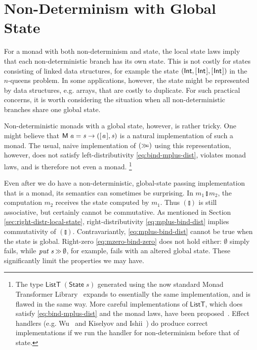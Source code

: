 \documentclass{llncs}
\newcommand{\Conid}[1]{\mathit{#1}}
\newcommand{\Varid}[1]{\mathit{#1}}
\let\Varid\mathit
\let\Conid\mathsf
\begin{document}
\section{Non-Determinism with Global State}
\label{sec:nd-state-global}

For a monad with both non-determinism and state, the local state laws imply that each non-deterministic branch has its own state. This is not costly for states consisting of linked data structures, for example the state \ensuremath{(\Conid{Int},[\mskip1.5mu \Conid{Int}\mskip1.5mu],[\mskip1.5mu \Conid{Int}\mskip1.5mu])} in the \ensuremath{\Varid{n}}-queens problem. In some applications, however, the state might be represented by data structures, e.g. arrays, that are costly to duplicate. For such practical concerns, it is worth considering the situation when all non-deterministic branches share one global state.

Non-deterministic monads with a global state, however, is rather tricky.
One might believe that \ensuremath{\Conid{M}\;\Varid{a}\mathrel{=}\Varid{s}\to ([\mskip1.5mu \Varid{a}\mskip1.5mu],\Varid{s})} is a natural implementation of such a monad.
The usual, naive implementation of \ensuremath{(\mathrel{\hstretch{0.7}{>\!\!>\!\!=}})} using this representation, however, does not satisfy left-distributivity \eqref{eq:bind-mplus-dist}, violates monad laws, and is therefore not even a monad.
\footnote{
The type \ensuremath{\Conid{ListT}\;(\Conid{State}\;\Varid{s})} generated using the now standard Monad Transformer Library~\cite{MTL:14} expands to essentially the same implementation, and is flawed in the same way.
More careful implementations of \ensuremath{\Conid{ListT}}, which does satisfy \eqref{eq:bind-mplus-dist} and the monad laws, have been proposed~\cite{Gale:07:ListT,Volkov:14:list-t}.
Effect handlers (e.g. Wu~\cite{Wu:14:Effect} and Kiselyov and Ishii~\cite{KiselyovIshii:15:Freer}) do produce correct implementations if we run the handler for non-determinism before that of state.
}

Even after we do have a non-deterministic, global-state passing implementation that is a monad, its semantics can sometimes be surprising.
In \ensuremath{\Varid{m}_{1}\mathbin{\talloblong}\Varid{m}_{2}}, the computation \ensuremath{\Varid{m}_{2}} receives the state computed by \ensuremath{\Varid{m}_{1}}.
Thus \ensuremath{(\talloblong)} is still associative, but certainly cannot be commutative.
As mentioned in Section \ref{sec:right-distr-local-state}, right-distributivity \eqref{eq:mplus-bind-dist} implies commutativity of \ensuremath{(\talloblong)}.
Contravariantly, \eqref{eq:mplus-bind-dist} cannot be true when the state is global.
Right-zero \eqref{eq:mzero-bind-zero} does not hold either: \ensuremath{\emptyset} simply fails, while \ensuremath{\Varid{put}\;\Varid{s}\mathbin{\hstretch{0.7}{>\!\!>}}\emptyset}, for example, fails with an altered global state.
These significantly limit the properties we may have.
\end{document}

